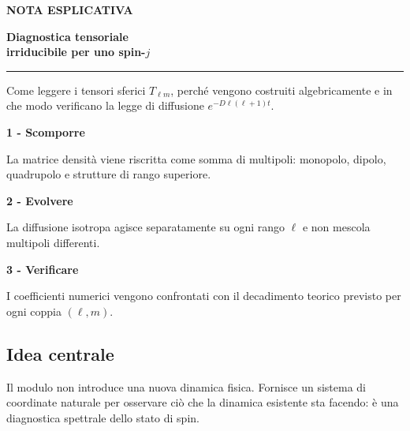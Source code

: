 \documentclass[10pt,a4paper]{article}
\newcommand{\cardtitle}[1]{{\sffamily\bfseries\color{Navy}#1\par}\smallskip}
\begin{document}
\thispagestyle{fancy}
\vspace*{22mm}

{\sffamily\bfseries\small\color{Teal}\MakeUppercase{Nota esplicativa}}\par
\vspace{5mm}
{\sffamily\bfseries\fontsize{27}{31}\selectfont\color{Navy}
Diagnostica tensoriale\\[1mm]
irriducibile per uno spin-$j$\par}

\vspace{5mm}
{\color{Gold}\rule{22mm}{2.2mm}}

\vspace{9mm}
{\fontsize{12}{17}\selectfont\color{Muted}
Come leggere i tensori sferici $T_{\ell m}$, perch\'e vengono costruiti
algebricamente e in che modo verificano la legge di diffusione
$e^{-D\ell(\ell+1)t}$.\par}

\vspace{10mm}
\begin{tcbraster}[
  raster columns=3,
  raster equal height=rows,
  raster column skip=3mm
]
  \begin{notebox}
    \cardtitle{1 - Scomporre}
    La matrice densit\`a viene riscritta come somma di multipoli: monopolo,
    dipolo, quadrupolo e strutture di rango superiore.
  \end{notebox}
  \begin{notebox}[borderline west={2.4pt}{0pt}{Gold}]
    \cardtitle{2 - Evolvere}
    La diffusione isotropa agisce separatamente su ogni rango $\ell$ e non
    mescola multipoli differenti.
  \end{notebox}
  \begin{notebox}[borderline west={2.4pt}{0pt}{Navy}]
    \cardtitle{3 - Verificare}
    I coefficienti numerici vengono confrontati con il decadimento teorico
    previsto per ogni coppia $(\ell,m)$.
  \end{notebox}
\end{tcbraster}

\vspace{9mm}
\subsection{Idea centrale}
Il modulo non introduce una nuova dinamica fisica. Fornisce un sistema di
coordinate naturale per osservare ci\`o che la dinamica esistente sta facendo:
\`e una diagnostica spettrale dello stato di spin.
\end{document}
